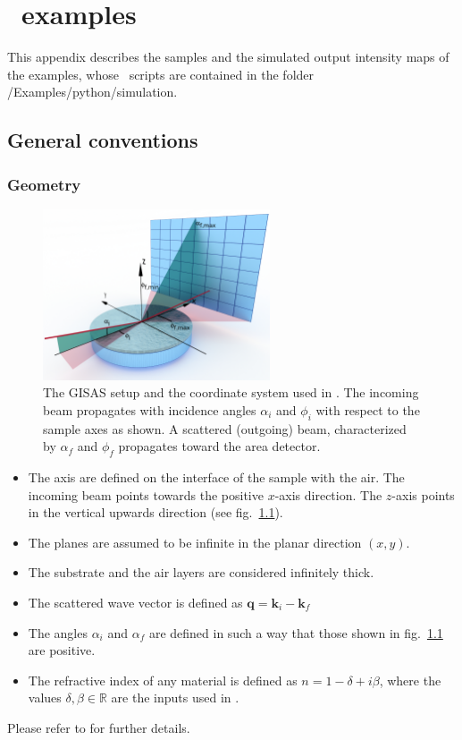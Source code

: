 \chapter{\Python\ examples}
This appendix describes the samples and the simulated output intensity maps of the examples, whose \Python\ scripts are contained in the folder /Examples/python/simulation.

\section{General conventions}
\subsection{Geometry}

\begin{figure}[H]
\begin{center}
\includegraphics[width=0.6\textwidth]{Figures/BAgeometry_wide}
\end{center}
\caption{The GISAS setup and the coordinate system used in
\BornAgain. The incoming  beam propagates with incidence angles $\alpha_i$ and $\phi_i$ with respect to the sample axes as shown. A scattered (outgoing) beam, characterized by $\alpha_f$ and $\phi_f$ propagates toward the area detector.}
\label{fig:BAsetup_app}
\end{figure}


\begin{itemize}
\item The axis are defined on the interface of the sample with the air. 
The incoming beam points towards the positive $x$-axis direction. The $z$-axis points in the vertical upwards direction (see fig.~\ref{fig:BAsetup_app}).
\item The planes are assumed to be infinite in the planar direction $(x, y)$.
\item The substrate and the air layers are considered infinitely thick.
\item The scattered wave vector is defined as $\mathbf{q}=\mathbf{k}_i-\mathbf{k}_f$
\item The angles $\alpha_i$ and $\alpha_f$ are defined in such a way that those shown in fig.~\ref{fig:BAsetup_app}  are positive.
\item The refractive index of any material is defined as $n=1- \delta + i \beta$, where the values $\delta, \beta \in \mathbb R$ are the inputs used in \BornAgain.
\end{itemize}
Please refer to  for further details.

